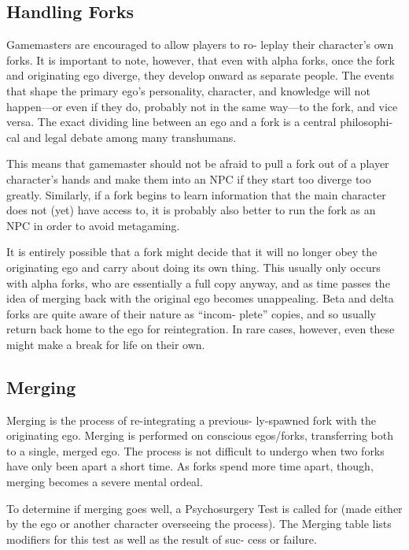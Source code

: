 \subsection{Handling Forks}

Gamemasters are encouraged to allow players to ro-
leplay their character's own forks. It is important to 
note, however, that even with alpha forks, once the 
fork and originating ego diverge, they develop onward 
as separate people. The events that shape the primary 
ego's personality, character, and knowledge will not 
happen—or even if they do, probably not in the same 
way—to the fork, and vice versa. The exact dividing 
line between an ego and a fork is a central philosophi-
cal and legal debate among many transhumans.

This means that gamemaster should not be afraid 
to pull a fork out of a player character's hands and 
make them into an NPC if they start too diverge too 
greatly. Similarly, if a fork begins to learn information 
that the main character does not (yet) have access to, 
it is probably also better to run the fork as an NPC in 
order to avoid metagaming.

It is entirely possible that a fork might decide that 
it will no longer obey the originating ego and carry 
about doing its own thing. This usually only occurs 
with alpha forks, who are essentially a full copy 
anyway, and as time passes the idea of merging back 
with the original ego becomes unappealing. Beta and 
delta forks are quite aware of their nature as ``incom-
plete'' copies, and so usually return back home to the 
ego for reintegration. In rare cases, however, even 
these might make a break for life on their own.

\subsection{Merging}


Merging is the process of re-integrating a previous-
ly-spawned fork with the originating ego. Merging is 
performed on conscious egos/forks, transferring both 
to a single, merged ego. The process is not difficult 
to undergo when two forks have only been apart a 
short time. As forks spend more time apart, though, 
merging becomes a severe mental ordeal.

To determine if merging goes well, a Psychosurgery 
Test is called for (made either by the ego or another 
character overseeing the process). The Merging table 
lists modifiers for this test as well as the result of suc-
cess or failure.

